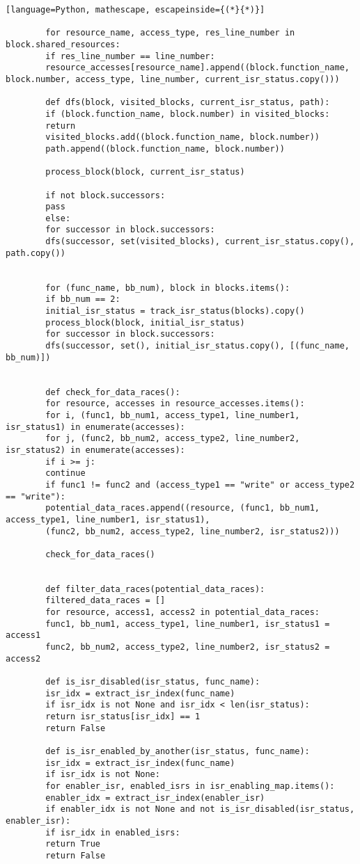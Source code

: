 \documentclass[
fancyheadings, %
%
%
]{stsreprt}
\begin{document}
\begin{lstlisting}[language=Python, mathescape, escapeinside={(*}{*)}]
		
		for resource_name, access_type, res_line_number in block.shared_resources:
		if res_line_number == line_number:
		resource_accesses[resource_name].append((block.function_name, block.number, access_type, line_number, current_isr_status.copy()))
		
		def dfs(block, visited_blocks, current_isr_status, path):
		if (block.function_name, block.number) in visited_blocks:
		return
		visited_blocks.add((block.function_name, block.number))
		path.append((block.function_name, block.number))
		
		process_block(block, current_isr_status)
		
		if not block.successors:
		pass
		else:
		for successor in block.successors:
		dfs(successor, set(visited_blocks), current_isr_status.copy(), path.copy())
		
		
		for (func_name, bb_num), block in blocks.items():
		if bb_num == 2:  
		initial_isr_status = track_isr_status(blocks).copy()
		process_block(block, initial_isr_status)
		for successor in block.successors:
		dfs(successor, set(), initial_isr_status.copy(), [(func_name, bb_num)])
		
		
		def check_for_data_races():
		for resource, accesses in resource_accesses.items():
		for i, (func1, bb_num1, access_type1, line_number1, isr_status1) in enumerate(accesses):
		for j, (func2, bb_num2, access_type2, line_number2, isr_status2) in enumerate(accesses):
		if i >= j:
		continue  
		if func1 != func2 and (access_type1 == "write" or access_type2 == "write"):
		potential_data_races.append((resource, (func1, bb_num1, access_type1, line_number1, isr_status1),
		(func2, bb_num2, access_type2, line_number2, isr_status2)))
		
		check_for_data_races()
		
		
		def filter_data_races(potential_data_races):
		filtered_data_races = []
		for resource, access1, access2 in potential_data_races:
		func1, bb_num1, access_type1, line_number1, isr_status1 = access1
		func2, bb_num2, access_type2, line_number2, isr_status2 = access2
		
		def is_isr_disabled(isr_status, func_name):
		isr_idx = extract_isr_index(func_name)
		if isr_idx is not None and isr_idx < len(isr_status):
		return isr_status[isr_idx] == 1
		return False
		
		def is_isr_enabled_by_another(isr_status, func_name):
		isr_idx = extract_isr_index(func_name)
		if isr_idx is not None:
		for enabler_isr, enabled_isrs in isr_enabling_map.items():
		enabler_idx = extract_isr_index(enabler_isr)
		if enabler_idx is not None and not is_isr_disabled(isr_status, enabler_isr):
		if isr_idx in enabled_isrs:
		return True
		return False
		

\end{lstlisting}
\end{document}
